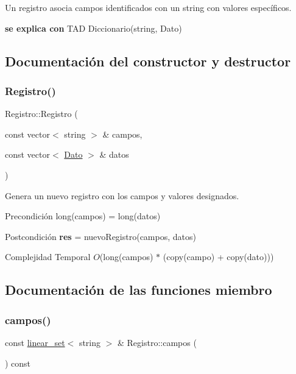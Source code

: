 Un registro asocia campos identificados con un string con valores específicos.

{\bfseries se explica con} T\+AD Diccionario(string, Dato) 

\subsection{Documentación del constructor y destructor}
\mbox{\label{classRegistro_af3717314d0e658a463ffd8ac5b073441}} 
\subsubsection{\texorpdfstring{Registro()}{Registro()}}
{\footnotesize\ttfamily Registro\+::\+Registro (\begin{DoxyParamCaption}\item[{const vector$<$ string $>$ \&}]{campos,  }\item[{const vector$<$ \mbox{\hyperlink{classDato}{Dato}} $>$ \&}]{datos }\end{DoxyParamCaption})}



Genera un nuevo registro con los campos y valores designados. 

\begin{DoxyPrecond}{Precondición}
long(campos) = long(datos) 
\end{DoxyPrecond}
\begin{DoxyPostcond}{Postcondición}
{\bfseries res} = nuevo\+Registro(campos, datos)
\end{DoxyPostcond}

\begin{DoxyDescription}
\item[Complejidad Temporal]$O$(long(campos) $\ast$ (copy(campo) + copy(dato)))
\end{DoxyDescription}

\subsection{Documentación de las funciones miembro}
\mbox{\label{classRegistro_a6c6e8fbd5aa47acd14597f240b32c95e}} 
\subsubsection{\texorpdfstring{campos()}{campos()}}
{\footnotesize\ttfamily const \mbox{\hyperlink{classlinear__set}{linear\+\_\+set}}$<$ string $>$ \& Registro\+::campos (\begin{DoxyParamCaption}{ }\end{DoxyParamCaption}) const}



